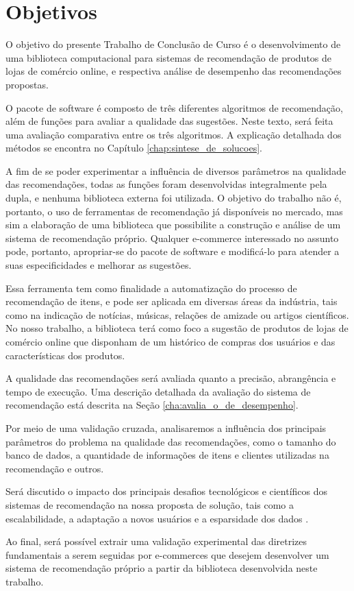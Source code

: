 \section[Objetivos]{Objetivos}
\label{chap:objetivos}

O objetivo do presente Trabalho de Conclusão de Curso é o desenvolvimento de uma biblioteca computacional para sistemas de recomendação de produtos de lojas de comércio online, e respectiva análise de desempenho das recomendações propostas. 

O pacote de software é composto de três diferentes algoritmos de recomendação, além de funções para avaliar a qualidade das sugestões. Neste texto, será feita uma avaliação comparativa entre os três algoritmos. A explicação detalhada dos métodos se encontra no Capítulo \ref{chap:sintese_de_solucoes}.  

A fim de se poder experimentar a influência de diversos parâmetros na qualidade das recomendações, todas as funções foram desenvolvidas integralmente pela dupla, e nenhuma biblioteca externa foi utilizada. O objetivo do trabalho não é, portanto, o uso de ferramentas de recomendação já disponíveis no mercado, mas sim a elaboração de uma biblioteca que possibilite a construção e análise de um sistema de recomendação  próprio. Qualquer e-commerce interessado no assunto pode, portanto, apropriar-se do pacote de software e modificá-lo para atender a suas especificidades e melhorar as sugestões.

Essa ferramenta tem como finalidade a automatização do processo de recomendação de itens, e pode ser aplicada em diversas áreas da indústria, tais como na indicação de notícias, músicas, relações de amizade ou artigos científicos. No nosso trabalho, a biblioteca terá como foco a sugestão de produtos de lojas de comércio online que disponham de um histórico de compras dos usuários e das características dos produtos.

A qualidade das recomendações será avaliada quanto a precisão, abrangência e tempo de execução. Uma descrição detalhada da avaliação do sistema de recomendação está descrita na Seção \ref{cha:avalia_o_de_desempenho}.

Por meio de uma validação cruzada, analisaremos a influência dos principais parâmetros do problema na qualidade das recomendações, como o tamanho do banco de dados, a quantidade de informações de itens e clientes utilizadas na recomendação e outros.

Será discutido o impacto dos principais desafios tecnológicos e científicos dos sistemas de recomendação na nossa proposta de solução, tais como a escalabilidade, a adaptação a novos usuários e a esparsidade dos dados \cite{sarwar2000analysis}.

Ao final, será possível extrair uma validação experimental das diretrizes fundamentais a serem seguidas por e-commerces que desejem desenvolver um sistema de recomendação próprio a partir da biblioteca desenvolvida neste trabalho. 